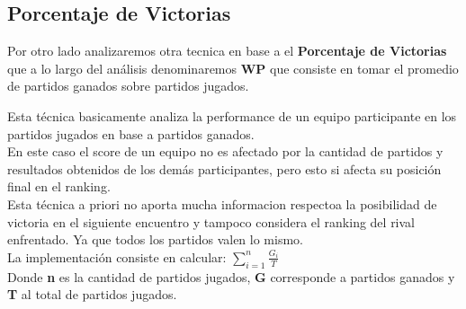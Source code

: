 \newpage
\subsection{Porcentaje de Victorias}

Por otro lado analizaremos otra tecnica en base a el \textbf{Porcentaje de Victorias} que a lo largo del análisis denominaremos \textbf{WP} que consiste en 
tomar el promedio de partidos ganados sobre partidos jugados.

Esta técnica basicamente analiza la performance de un equipo participante en los partidos jugados en base a partidos ganados. \\

En este caso el score de un equipo no es afectado por la cantidad de partidos y resultados obtenidos de los demás participantes, pero esto si afecta su posición final en el ranking. \\

Esta técnica a priori no aporta mucha informacion respectoa la posibilidad de victoria en el siguiente encuentro y tampoco considera el ranking del rival enfrentado.
Ya que todos los partidos valen lo mismo. \\

La implementación consiste en calcular: $\sum_{i=1}^n{} \frac{G_i}{T}$ \\

Donde \textbf{n} es la cantidad de partidos jugados, \textbf{G} corresponde a partidos ganados y \textbf{T} al total de partidos jugados. \\
